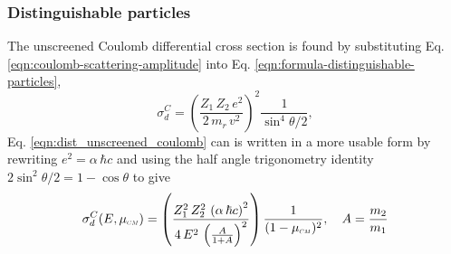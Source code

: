 \subsubsection{Distinguishable particles}
The unscreened Coulomb differential cross section is found by substituting Eq. \eqref{eqn:coulomb-scattering-amplitude} into Eq. \eqref{eqn:formula-distinguishable-particles},
\begin{equation} \label{eqn:dist_unscreened_coulomb}
    \sigma_{d}^{C} = \left(\dfrac{Z_1 \, Z_2 \, e^2}{2 \, m_r \, v^2}\right)^2 \dfrac{1}{\sin^4 \theta/2},
\end{equation}
Eq. \eqref{eqn:dist_unscreened_coulomb} can is written in a more usable form by rewriting $e^2 = \alpha \, \hbar c$ and using the half angle trigonometry identity $2 \sin^2 \theta / 2 = 1 - \cos \theta$ to give
\begin{equation} \label{eqn:coulomb-dcs}
    \sigma_{d}^{C}(E,\mucm) = \left(\dfrac{Z_1^2 \, Z_2^2 \, \left(\alpha \, \hbar c\right)^2}{ 4 \, E^2 \, \left(\frac{A}{1 + A} \right)^2}\right) \dfrac{1}{(1 - \mucm)^2}, \quad A = \dfrac{m_2}{m_1}
\end{equation}


